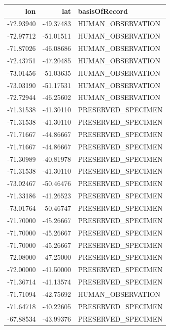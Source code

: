 \documentclass[]{book}
\newenvironment{Shaded}{\begin{snugshade}}{\end{snugshade}}
\newcommand{\KeywordTok}[1]{\textcolor[rgb]{0.13,0.29,0.53}{\textbf{#1}}}
\newcommand{\NormalTok}[1]{#1}
\newcommand{\OperatorTok}[1]{\textcolor[rgb]{0.81,0.36,0.00}{\textbf{#1}}}
\newcommand{\StringTok}[1]{\textcolor[rgb]{0.31,0.60,0.02}{#1}}
\begin{document}
\begin{Shaded}
\end{Shaded}

\begin{tabular}{r|r|l}
\hline
lon & lat & basisOfRecord\\
\hline
-72.93940 & -49.37483 & HUMAN\_OBSERVATION\\
\hline
-72.97712 & -51.01511 & HUMAN\_OBSERVATION\\
\hline
-71.87026 & -46.08686 & HUMAN\_OBSERVATION\\
\hline
-72.43751 & -47.20485 & HUMAN\_OBSERVATION\\
\hline
-73.01456 & -51.03635 & HUMAN\_OBSERVATION\\
\hline
-73.03190 & -51.17531 & HUMAN\_OBSERVATION\\
\hline
-72.72944 & -46.25602 & HUMAN\_OBSERVATION\\
\hline
-71.31538 & -41.30110 & PRESERVED\_SPECIMEN\\
\hline
-71.31538 & -41.30110 & PRESERVED\_SPECIMEN\\
\hline
-71.71667 & -44.86667 & PRESERVED\_SPECIMEN\\
\hline
-71.71667 & -44.86667 & PRESERVED\_SPECIMEN\\
\hline
-71.30989 & -40.81978 & PRESERVED\_SPECIMEN\\
\hline
-71.31538 & -41.30110 & PRESERVED\_SPECIMEN\\
\hline
-73.02467 & -50.46476 & PRESERVED\_SPECIMEN\\
\hline
-71.33186 & -41.26523 & PRESERVED\_SPECIMEN\\
\hline
-73.01764 & -50.46747 & PRESERVED\_SPECIMEN\\
\hline
-71.70000 & -45.26667 & PRESERVED\_SPECIMEN\\
\hline
-71.70000 & -45.26667 & PRESERVED\_SPECIMEN\\
\hline
-71.70000 & -45.26667 & PRESERVED\_SPECIMEN\\
\hline
-72.08000 & -47.25000 & PRESERVED\_SPECIMEN\\
\hline
-72.00000 & -41.50000 & PRESERVED\_SPECIMEN\\
\hline
-71.36714 & -41.13574 & PRESERVED\_SPECIMEN\\
\hline
-71.71094 & -42.75692 & HUMAN\_OBSERVATION\\
\hline
-71.64718 & -40.22605 & PRESERVED\_SPECIMEN\\
\hline
-67.88534 & -43.99376 & PRESERVED\_SPECIMEN\\
\hline
\end{tabular}
\end{document}
